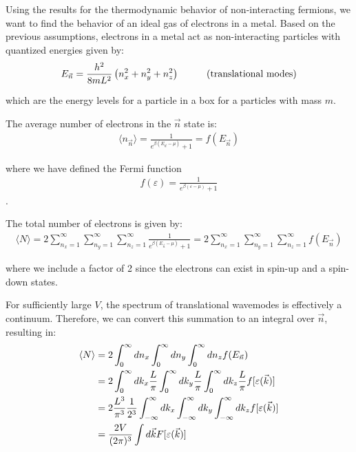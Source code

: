 \documentclass[book.tex]{subfiles}
\begin{document}
Using the results for the thermodynamic behavior of non-interacting fermions, we want to find the behavior of an ideal gas of electrons in a metal. Based on the previous assumptions, electrons in a metal act as non-interacting particles with quantized energies given by:
\begin{align}
E_{\vec{n}} = \frac{h^2}{8mL^2}\left(n_x^2+n_y^2+n_z^2\right) \hspace{1.0cm} \text{(translational modes)} \notag
\end{align}

\noindent which are the energy levels for a particle in a box for a particles with mass $m$.%

The average number of electrons in the $\vec{n}$ state is:
\begin{align}\label{Eq7}
\langle n_{\vec{n}} \rangle = \frac{1}{e^{\beta (E_{\vec{n}} - \mu)} + 1} = f(E_{\vec{n}})
\end{align}

\noindent where we have defined the Fermi function 
\begin{align}
f(\varepsilon) = \frac{1}{e^{\beta(\varepsilon - \mu)} + 1}
\end{align}.

The total number of electrons is given by:
\begin{align}
\langle N \rangle = 2 \sum_{n_x = 1}^\infty \sum_{n_y = 1}^\infty \sum_{n_z = 1}^\infty \frac{1}{e^{\beta (E_{\vec{n}} - \mu)} + 1} =  2 \sum_{n_x = 1}^\infty \sum_{n_y = 1}^\infty \sum_{n_z = 1}^\infty f(E_{\vec{n}})
\end{align}

\noindent where we include a factor of 2 since the electrons can exist in spin-up and a spin-down states.

For sufficiently large $V$, the spectrum of translational wavemodes is effectively a continuum. Therefore, we can convert this summation to an integral over $\vec{n}$, resulting in:
\begin{align}
\langle N \rangle &= 2 \int_0^\infty dn_x \int_0^\infty dn_y \int_0^\infty dn_z f(E_{\vec{n}})\\
&= 2 \int_0^\infty dk_x \frac{L}{\pi} \int_0^\infty dk_y \frac{L}{\pi} \int_0^\infty dk_z \frac{L}{\pi} f[\varepsilon (\vec{k})] \notag\\
&= 2 \frac{L^3}{\pi^3} \frac{1}{2^3} \int_{-\infty}^\infty dk_x \int_{-\infty}^\infty dk_y \int_{-\infty}^\infty dk_z f[\varepsilon (\vec{k})] \\ 
&= \frac{2V}{(2\pi)^3} \int d\vec{k} F[\varepsilon (\vec{k})] 
\end{align}
\end{document}

